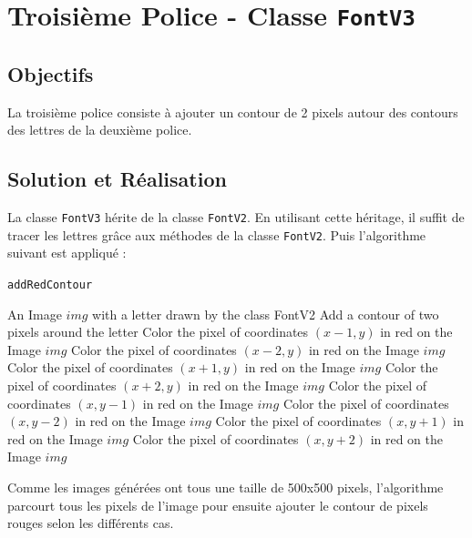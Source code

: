 \documentclass[a4paper, 12pt]{article}
\begin{document}
\newpage
\section{Troisième Police - Classe \texttt{FontV3}}		
\subsection{Objectifs}
La troisième police consiste à ajouter un contour de 2 pixels autour des contours des lettres de la deuxième police. 

\subsection{Solution et Réalisation}
La classe \texttt{FontV3} hérite de la classe \texttt{FontV2}. En utilisant cette héritage, il suffit de tracer les lettres grâce aux méthodes de la classe \texttt{FontV2}. Puis l'algorithme suivant est appliqué :   

\begin{algorithm}
	\caption{\texttt{addRedContour}}
		\begin{algorithmic}[1]
		\Require An Image $img$ with a letter drawn by the class FontV2
		\Ensure Add a contour of two pixels around the letter
						\State Color the pixel of coordinates $(x-1, y)$ in red on the Image $img$
						\State Color the pixel of coordinates $(x-2, y)$ in red on the Image $img$
						\EndIf
						\State Color the pixel of coordinates $(x+1, y)$ in red on the Image $img$
						\State Color the pixel of coordinates $(x+2, y)$ in red on the Image $img$
					\EndIf
						\State Color the pixel of coordinates $(x, y-1)$ in red on the Image $img$
						\State Color the pixel of coordinates $(x, y-2)$ in red on the Image $img$
					\EndIf
						\State Color the pixel of coordinates $(x, y+1)$ in red on the Image $img$
						\State Color the pixel of coordinates $(x, y+2)$ in red on the Image $img$ 
					\EndIf	
				\EndIf	
			\EndFor
		\EndFor
		\EndFunction
		\end{algorithmic}
\end{algorithm}

Comme les images générées ont tous une taille de 500x500 pixels, l'algorithme parcourt tous les pixels de l'image pour ensuite ajouter le contour de pixels rouges selon les différents cas. \\
\end{document}
